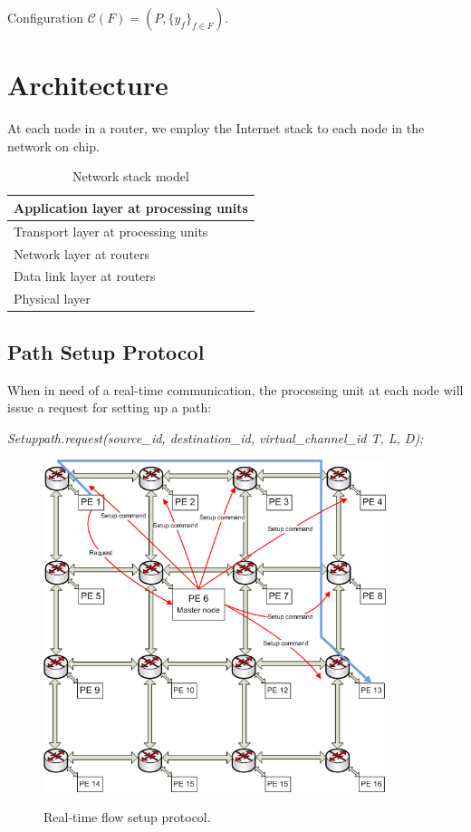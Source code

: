 \documentclass[10pt]{article}
\begin{document}
Configuration $\mathcal{C}(F)=(P, \{y_f\}_{f \in F})$.
\section{Architecture}
At each node in a router, we employ the Internet stack to each node in the 
network on chip.
\begin{table}[h]
\begin{center}
  \begin{tabular}{ | l | }
    \hline
    Application layer at processing units \\ \hline
    Transport layer at processing units \\ \hline
    Network layer at routers \\ \hline
	Data link layer at routers \\ \hline
	Physical layer \\
    \hline
  \end{tabular}
\end{center}
\caption{Network stack model}
\label{table:NetworkStack}
\end{table}

\subsection{Path Setup Protocol}
When in need of a real-time communication, the processing unit at each node 
will issue a request for setting up a path:

{\em Setuppath.request(source\_id, destination\_id, virtual\_channel\_id T, L,
D);}

\begin{figure}[htp]
\centering
\includegraphics[width=10cm]{pics/Protocol2}
\label{fig:ReqSetup}
\caption[Setup request for a real-time flow.]
{Real-time flow setup protocol.}
\end{figure}
\end{document}
